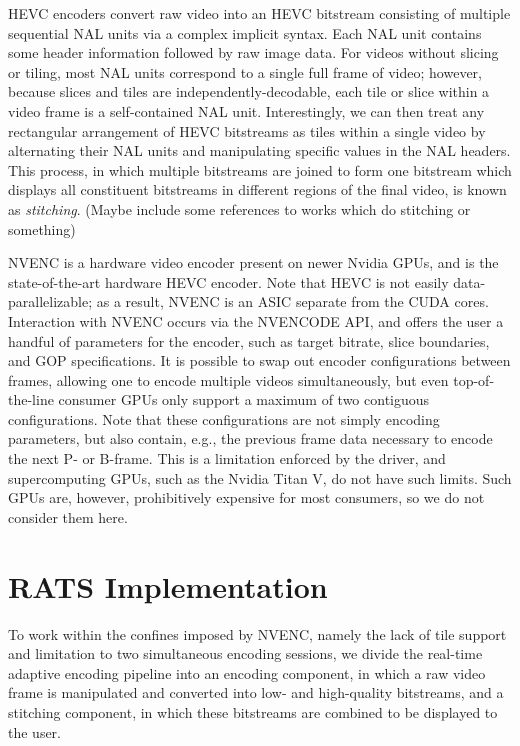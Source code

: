 HEVC encoders convert raw video into an HEVC bitstream consisting of multiple sequential NAL units via a complex implicit syntax. Each NAL unit contains some header information followed by raw image data. For videos without slicing or tiling, most NAL units correspond to a single full frame of video; however, because slices and tiles are independently-decodable, each tile or slice within a video frame is a self-contained NAL unit. Interestingly, we can then treat any rectangular arrangement of HEVC bitstreams as tiles within a single video by alternating their NAL units and manipulating specific values in the NAL headers. This process, in which multiple bitstreams are joined to form one bitstream which displays all constituent bitstreams in different regions of the final video, is known as \textit{stitching}. (Maybe include some references to works which do stitching or something)

NVENC is a hardware video encoder present on newer Nvidia GPUs, and is the state-of-the-art hardware HEVC encoder. Note that HEVC is not easily data-parallelizable; as a result, NVENC is an ASIC separate from the CUDA cores. Interaction with NVENC occurs via the NVENCODE API, and offers the user a handful of parameters for the encoder, such as target bitrate, slice boundaries, and GOP specifications. It is possible to swap out encoder configurations between frames, allowing one to encode multiple videos simultaneously, but even top-of-the-line consumer GPUs only support a maximum of two contiguous configurations. Note that these configurations are not simply encoding parameters, but also contain, e.g., the previous frame data necessary to encode the next P- or B-frame. This is a limitation enforced by the driver, and supercomputing GPUs, such as the Nvidia Titan V, do not have such limits. Such GPUs are, however, prohibitively expensive for most consumers, so we do not consider them here.

\section{RATS Implementation}
To work within the confines imposed by NVENC, namely the lack of tile support and limitation to two simultaneous encoding sessions, we divide the real-time adaptive encoding pipeline into an encoding component, in which a raw video frame is manipulated and converted into low- and high-quality bitstreams, and a stitching component, in which these bitstreams are combined to be displayed to the user.

